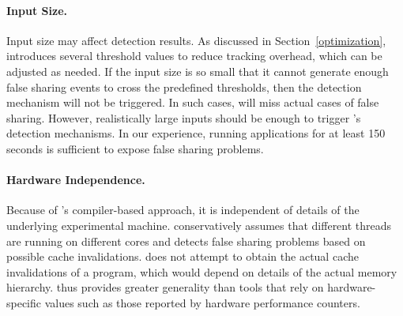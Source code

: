 \paragraph{Input Size.} Input size may affect detection results.  As discussed in Section~\ref{optimization}, \Predator{} introduces several threshold values to reduce tracking overhead, which can be adjusted as needed. If the input size is so small that it cannot generate enough false sharing events to cross the predefined thresholds, then the detection mechanism will not be triggered. In such cases, \Predator{} will miss actual cases of false sharing. However, realistically large inputs should be enough to trigger \Predator{}'s detection mechanisms. In our experience, running applications for at least 150 seconds is sufficient to expose false sharing problems. 

\paragraph{Hardware Independence.} Because of \Predator{}'s compiler-based approach, it is independent of details of the underlying experimental machine. \Predator{} conservatively assumes that different threads are running on different cores and detects false sharing problems based on possible cache invalidations. \Predator{} does not attempt to obtain the actual cache invalidations of a program, which would depend on details of the actual memory hierarchy. \Predator{} thus provides greater generality than tools that rely on hardware-specific values such as those reported by hardware performance counters.


